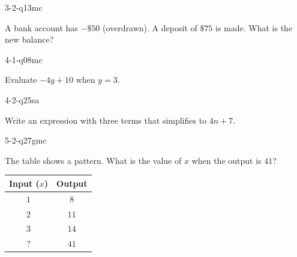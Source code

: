 \begin{practiceQuestion}{3-2-q13}{mc}
\begin{questionText}
A bank account has $-\$50$ (overdrawn). A deposit of $\$75$ is made. What is the new balance?
\end{questionText}
\end{practiceQuestion}

\begin{practiceQuestion}{4-1-q08}{mc}
\begin{questionText}
Evaluate $-4y + 10$ when $y = 3$.
\end{questionText}
\end{practiceQuestion}

\begin{practiceQuestion}{4-2-q25}{sa}
\begin{questionText}
Write an expression with three terms that simplifies to $4n + 7$.
\end{questionText}
\end{practiceQuestion}

\begin{practiceQuestion}{5-2-q27}{gmc}
\begin{questionText}
The table shows a pattern. What is the value of $x$ when the output is $41$?

\begin{center}
\begin{tabular}{|c|c|}
\hline
\textbf{Input ($x$)} & \textbf{Output} \\
\hline
$1$ & $8$ \\
\hline
$2$ & $11$ \\
\hline
$3$ & $14$ \\
\hline
$?$ & $41$ \\
\hline
\end{tabular}
\end{center}
\end{questionText}
\end{practiceQuestion}

